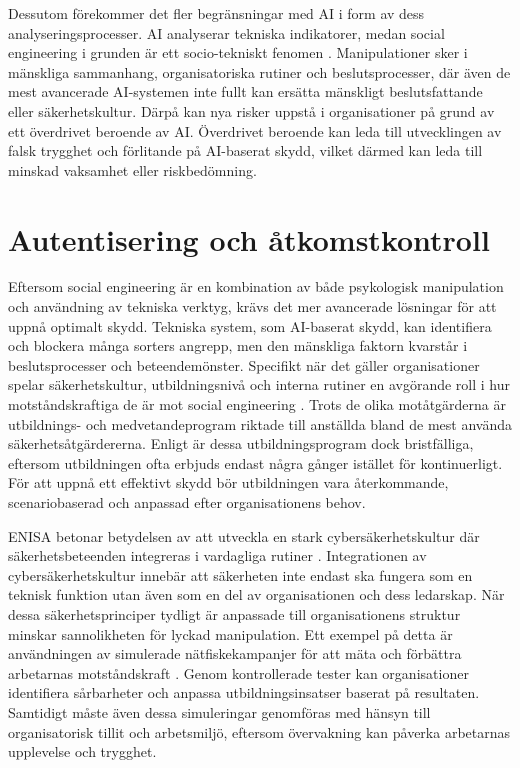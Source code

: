 Dessutom förekommer det fler begränsningar med AI i form av dess analyseringsprocesser. AI analyserar tekniska indikatorer, medan social engineering i grunden är ett socio-tekniskt fenomen \cite{washo2021interdisciplinary}. 
Manipulationer sker i mänskliga sammanhang, organisatoriska rutiner och beslutsprocesser, där även de mest avancerade AI-systemen inte fullt kan ersätta mänskligt beslutsfattande eller  säkerhetskultur. Därpå kan nya risker 
uppstå i organisationer på grund av ett överdrivet beroende av AI. Överdrivet beroende kan leda till utvecklingen av falsk trygghet och förlitande på AI-baserat skydd, vilket därmed kan leda till minskad vaksamhet eller riskbedömning.  

\section{Autentisering och åtkomstkontroll}
Eftersom social engineering är en kombination av både psykologisk manipulation och användning av tekniska verktyg, krävs det mer avancerade lösningar för att uppnå optimalt skydd. Tekniska system, som AI-baserat skydd, 
kan identifiera och blockera många sorters angrepp, men den mänskliga faktorn kvarstår i beslutsprocesser och beteendemönster. Specifikt när det gäller organisationer spelar säkerhetskultur, utbildningsnivå och interna rutiner en avgörande 
roll i hur motståndskraftiga de är mot social engineering \cite{washo2021interdisciplinary}. Trots de olika motåtgärderna är utbildnings- och medvetandeprogram riktade till anställda bland de mest använda säkerhetsåtgärdererna. Enligt \cite{albladi2019training_awareness} är 
dessa utbildningsprogram dock bristfälliga, eftersom utbildningen ofta erbjuds endast några gånger istället för kontinuerligt. För att uppnå ett effektivt skydd bör utbildningen vara återkommande, scenariobaserad och anpassad 
efter organisationens behov. 

ENISA betonar betydelsen av att utveckla en stark cybersäkerhetskultur där säkerhetsbeteenden integreras i vardagliga rutiner \cite{enisa2018cybersecurity_culture}. Integrationen av cybersäkerhetskultur innebär att säkerheten 
inte endast ska fungera som en teknisk funktion utan även som en del av organisationen och dess ledarskap. När dessa säkerhetsprinciper tydligt är anpassade till organisationens struktur minskar sannolikheten för lyckad manipulation. 
Ett exempel på detta är användningen av simulerade nätfiskekampanjer för att mäta och förbättra arbetarnas motståndskraft \cite{albladi2018defense_mechanisms}. Genom kontrollerade tester kan organisationer identifiera sårbarheter och 
anpassa utbildningsinsatser baserat på resultaten. Samtidigt måste även dessa simuleringar genomföras med hänsyn till organisatorisk tillit och arbetsmiljö, eftersom övervakning kan påverka arbetarnas upplevelse och trygghet.

